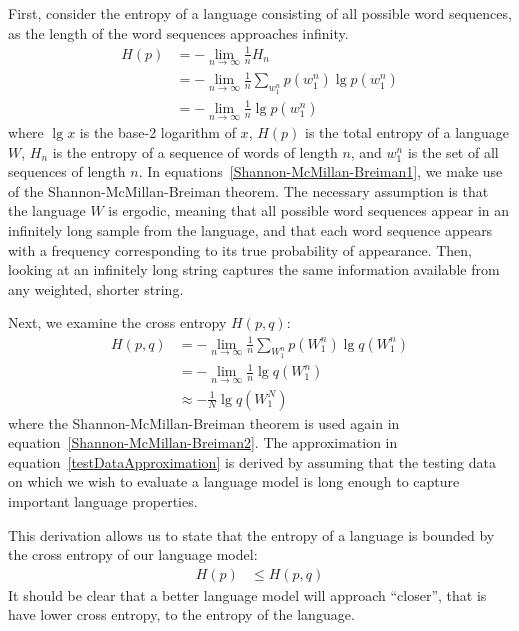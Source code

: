 \documentclass[10pt]{article}
\begin{document}
First, consider the entropy of a language consisting of all possible word sequences, as the length of the word sequences approaches infinity.
\begin{align}
H(p) &= - \lim_{n \to \infty} \frac{1}{n} H_n \\
&= - \lim_{n \to \infty} \frac{1}{n} \sum_{w_1^n} p(w_1^n) \lg p(w_1^n) \\
&= - \lim_{n \to \infty} \frac{1}{n} \lg p(w_1^n) \label{Shannon-McMillan-Breiman1}
\end{align}
where $\lg x$ is the base-2 logarithm of $x$, $H(p)$ is the total entropy of a language $W$, $H_n$ is the entropy of a sequence of words of length $n$, and $w_1^n$ is the set of all sequences of length $n$.
In equations~\ref{Shannon-McMillan-Breiman1}, we make use of the Shannon-McMillan-Breiman theorem.
The necessary assumption is that the language $W$ is ergodic, meaning that all possible word sequences appear in an infinitely long sample from the language, and that each word sequence appears with a frequency corresponding to its true probability of appearance.
Then, looking at an infinitely long string captures the same information available from any weighted, shorter string.

Next, we examine the cross entropy $H(p,q)$:
\begin{align}
H(p,q) &= - \lim_{n \to \infty} \frac{1}{n} \sum_{W_1^n} p(W_1^n) \lg q(W_1^n) \\
&= - \lim_{n \to \infty} \frac{1}{n} \lg q(W_1^n) \label{Shannon-McMillan-Breiman2} \\
&\approx -\frac{1}{N} \lg q(W_1^N) \label{testDataApproximation}
\end{align}
where the Shannon-McMillan-Breiman theorem is used again in equation~\ref{Shannon-McMillan-Breiman2}.
The approximation in equation~\ref{testDataApproximation} is derived by assuming that the testing data on which we wish to evaluate a language model is long enough to capture important language properties.

This derivation allows us to state that the entropy of a language is bounded by the cross entropy of our language model:
\begin{align}
H(p) &\leq H(p,q) \label{crossEntropyUpperBound}
\end{align}
It should be clear that a better language model will approach ``closer'', that is have lower cross entropy, to the entropy of the language.
\end{document}
